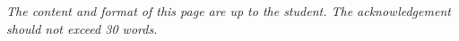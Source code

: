 
\cleardoublepage %


\emph{The content and format of this page are up to the student. The acknowledgement should not exceed 30 words.}